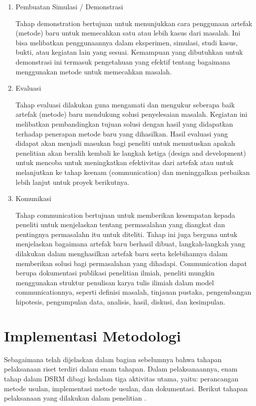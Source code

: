 \begin{enumerate}
\item Pembuatan Simulasi / Demonstrasi


Tahap demonstration bertujuan untuk menunjukkan cara penggunaan artefak (metode) baru untuk memecahkan satu atau lebih kasus dari masalah. Ini bisa melibatkan penggunaannya dalam eksperimen, simulasi, studi kasus, bukti, atau kegiatan lain yang sesuai. Kemampuan yang dibutuhkan untuk demonstrasi ini termasuk pengetahuan yang efektif tentang bagaimana menggunakan metode untuk memecahkan masalah.


\item Evaluasi


Tahap evaluasi dilakukan guna mengamati dan mengukur seberapa baik artefak (metode) baru mendukung solusi penyelesaian masalah. Kegiatan ini melibatkan pembandingkan tujuan solusi dengan hasil yang didapatkan terhadap penerapan metode baru yang dihasilkan. Hasil evaluasi yang didapat akan menjadi masukan bagi peneliti untuk memutuskan apakah penelitian akan beralih kembali ke langkah ketiga (design and development) untuk mencoba untuk meningkatkan efektivitas dari artefak atau untuk melanjutkan ke tahap keenam (communication) dan meninggalkan perbaikan lebih lanjut untuk proyek berikutnya.


\item Komunikasi


Tahap communication bertujuan untuk memberikan kesempatan kepada peneliti untuk menjelaskan tentang permasalahan yang diangkat dan pentingnya permasalahn itu untuk diteliti. Tahap ini juga berguna untuk menjelaskan bagaimana artefak baru berhasil dibuat, langkah-langkah yang dilakukan dalam menghasilkan artefak baru serta kelebihannya dalam memberikan solusi bagi permasalahan yang dihadapi. Communication dapat berupa dokumentasi publikasi penelitian ilmiah, peneliti mungkin menggunakan struktur penulisan karya tulis ilimiah dalam model communicationnya, seperti definisi masalah, tinjauan pustaka, pengembangan hipotesis, pengumpulan data, analisis, hasil, diskusi, dan kesimpulan.
\end{enumerate}


\section{Implementasi Metodologi}

Sebagaimana telah dijelaskan dalam bagian sebelumnya bahwa tahapan pelaksanaan riset terdiri dalam enam tahapan. Dalam pelaksanaannya, enam tahap dalam DSRM dibagi kedalam tiga aktivitas utama, yaitu: perancangan metode usulan, implementasi metode usulan, dan dokumentasi. Berikut tahapan pelaksanaan yang dilakukan dalam penelitian \theoriginaltitle.

